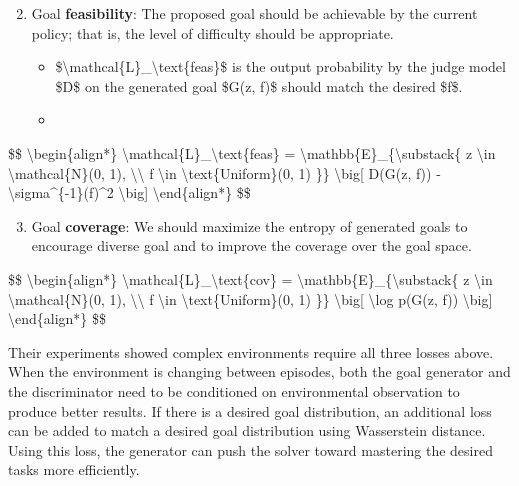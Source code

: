 \begin{enumerate}
\setcounter{enumi}{1}
\tightlist
\item
  Goal \textbf{feasibility}: The proposed goal should be achievable by the current policy; that is, the level of difficulty should be appropriate.

  \begin{itemize}
  \tightlist
  \item
    \$\textbackslash mathcal\{L\}\_\textbackslash text\{feas\}\$ is the output probability by the judge model \$D\$ on the generated goal \$G(z, f)\$ should match the desired \$f\$.
  \item
  \end{itemize}
\end{enumerate}

\$\$ \textbackslash begin\{align*\} \textbackslash mathcal\{L\}\_\textbackslash text\{feas\} = \textbackslash mathbb\{E\}\_\{\textbackslash substack\{ z \textbackslash in \textbackslash mathcal\{N\}(0, 1), \textbackslash\textbackslash{} f \textbackslash in \textbackslash text\{Uniform\}(0, 1) \}\} \textbackslash big{[} D(G(z, f)) - \textbackslash sigma\^{}\{-1\}(f)\^{}2 \textbackslash big{]} \textbackslash end\{align*\} \$\$

\begin{enumerate}
\setcounter{enumi}{2}
\tightlist
\item
  Goal \textbf{coverage}: We should maximize the entropy of generated goals to encourage diverse goal and to improve the coverage over the goal space.
\end{enumerate}

\$\$ \textbackslash begin\{align*\} \textbackslash mathcal\{L\}\_\textbackslash text\{cov\} = \textbackslash mathbb\{E\}\_\{\textbackslash substack\{ z \textbackslash in \textbackslash mathcal\{N\}(0, 1), \textbackslash\textbackslash{} f \textbackslash in \textbackslash text\{Uniform\}(0, 1) \}\} \textbackslash big{[} \textbackslash log p(G(z, f)) \textbackslash big{]} \textbackslash end\{align*\} \$\$

Their experiments showed complex environments require all three losses above. When the environment is changing between episodes, both the goal generator and the discriminator need to be conditioned on environmental observation to produce better results. If there is a desired goal distribution, an additional loss can be added to match a desired goal distribution using Wasserstein distance. Using this loss, the generator can push the solver toward mastering the desired tasks more efficiently.

